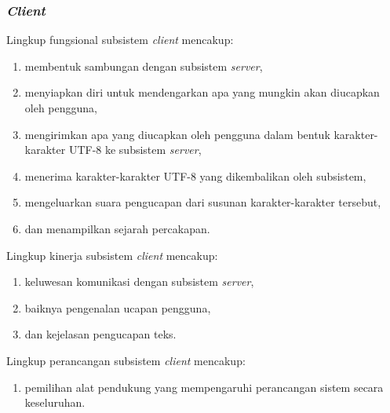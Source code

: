 \subsubsection*{\textit{Client}}
Lingkup fungsional subsistem \textit{client} mencakup:
\begin{enumerate}
\item membentuk sambungan dengan subsistem \textit{server},
\item menyiapkan diri untuk mendengarkan apa yang mungkin akan diucapkan oleh pengguna,
\item mengirimkan apa yang diucapkan oleh pengguna dalam bentuk karakter-karakter UTF-8 ke subsistem \textit{server},
\item menerima karakter-karakter UTF-8 yang dikembalikan oleh subsistem,
\item mengeluarkan suara pengucapan dari susunan karakter-karakter tersebut,
\item dan menampilkan sejarah percakapan.
\end{enumerate}
Lingkup kinerja subsistem \textit{client} mencakup:
\begin{enumerate}
\item keluwesan komunikasi dengan subsistem \textit{server},
\item baiknya pengenalan ucapan pengguna,
\item dan kejelasan pengucapan teks.
\end{enumerate}
Lingkup perancangan subsistem \textit{client} mencakup:
\begin{enumerate}
\item pemilihan alat pendukung yang mempengaruhi perancangan sistem secara keseluruhan.
\end{enumerate}
